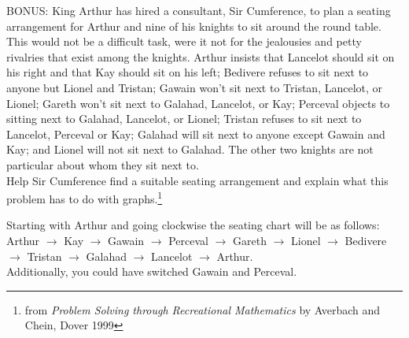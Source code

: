 \begin{questions}
\question BONUS: King Arthur has hired a consultant, Sir Cumference, to plan a seating arrangement for Arthur and nine of his knights to sit around the round table. This would not be a difficult task, were it not for the jealousies and petty rivalries that exist among the knights. Arthur insists that Lancelot should sit on his right and that Kay should sit on his left; Bedivere refuses to sit next to anyone but Lionel and Tristan; Gawain won't sit next to Tristan, Lancelot, or Lionel; Gareth won't sit next to Galahad, Lancelot, or Kay; Perceval objects to sitting next to Galahad, Lancelot, or Lionel; Tristan refuses to sit next to Lancelot, Perceval or Kay; Galahad will sit next to anyone except Gawain and Kay; and Lionel will not sit next to Galahad. The other two knights are not particular about whom they sit next to. \\
Help Sir Cumference find a suitable seating arrangement and explain what this problem has to do with graphs.\footnote{from \emph{Problem Solving through Recreational Mathematics} by Averbach and Chein, Dover 1999}
\begin{solution}
Starting with Arthur and going clockwise the seating chart will be as follows: Arthur $\rightarrow$ Kay $\rightarrow$ Gawain $\rightarrow$ Perceval $\rightarrow$ Gareth $\rightarrow$ Lionel $\rightarrow$ Bedivere $\rightarrow$ Tristan $\rightarrow$ Galahad $\rightarrow$ Lancelot $\rightarrow$ Arthur.\\
Additionally, you could have switched Gawain and Perceval.
\end{solution}







 
\end{questions}


